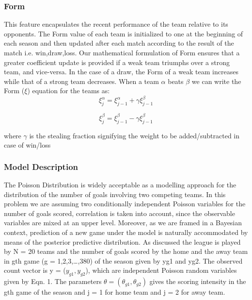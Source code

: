 \documentclass{article}
\begin{document}
\subsubsection{Form}
This feature encapsulates the recent performance of the team relative to its opponents. The Form value of each team is initialized to one at the beginning of each season and then updated after each match according to the result of the match i.e. win,draw,loss. Our mathematical formulation of Form ensures that a greater coefficient update is provided if a weak team triumphs over a strong team, and vice-versa. In the case of a draw, the Form of a weak team increases while that of a strong team decreases. 
When a team $\alpha$ beats $\beta$ we can write the Form ($\xi$) equation for the teams as:
\begin{equation}
\xi_{j}^{\alpha}= \xi_{j-1}^{\alpha}  + \gamma\xi_{j-1}^{\beta}
\label{eq:form_1}
\end{equation}

\begin{equation}
\xi_{j}^{\beta}= \xi_{j-1}^{\beta}  - \gamma\xi_{j-1}^{\beta}
\label{eq:form_2}
\end{equation}

where $\gamma$ is the stealing fraction signifying the weight to be added/subtracted in case of win/loss

\subsubsection{Model Description}

The Poisson Distribution is widely acceptable as a modelling approach for the distribution of the number of goals involving two competing teams. In this problem we are assuming two conditionally independent Poisson variables for the number of goals scored, correlation is taken into account, since the observable variables are mixed at an upper level. Moreover, as we are framed in a Bayesian context, prediction of a new game under the model is naturally accommodated by means of the posterior predictive distribution. As discussed the league is played by N = 20 teams and the number of goals scored by the home and the away team in gth game (g = 1,2,3,…,380) of the season given by yg1 and yg2. The observed count vector is y = ($y_{g1} , y_{g2}$), which are independent Poisson random variables given by Eqn. 1. The parameters $\theta = (\theta_{g1} , \theta_{g2})$ gives the scoring intensity in the gth game of the season and j = 1 for home team and j = 2 for away team.
\end{document}
